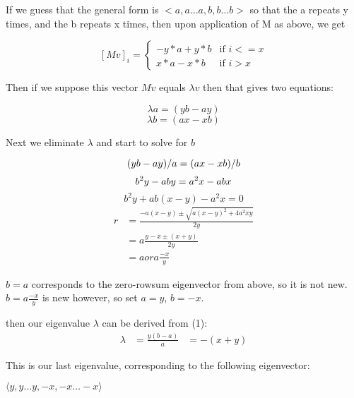 \documentclass[10pt,a4paper]{report}
\begin{document}
If we guess that the general form is $<a, a\ldots a, b, b\ldots b>$ so that the
a repeats y times, and the b repeats x times, then upon application of M as
above, we get

\[ {[Mv]}_i = \begin{cases}
	-y*a + y*b & \text{if } i <= x\\
	x*a - x*b & \text{if } i > x
\end{cases} \]

Then if we suppose this vector $Mv$ equals $\lambda v$ then that gives two
equations:

\begin{equation}
	\lambda a = (yb - ay)
\end{equation}
\begin{equation*}
	\lambda b = (ax - xb)
\end{equation*}

\pagebreak

Next we eliminate $\lambda$ and start to solve for $b$

\begin{equation*}
	(yb - ay)/a = (ax - xb)/b\\
\end{equation*}
\begin{equation*}
	b^2y - aby = a^2x - abx\\
\end{equation*}
\begin{equation*}
	b^2y + ab(x - y) - a^2x = 0
\end{equation*}
\begin{align*}
	r &= \frac{-a(x-y) \pm \sqrt{{a(x-y)}^2 + 4a^2xy}}{2y}\\
	  &= a\frac{y - x \pm (x + y)}{2y}\\
	  &= a or a\frac{-x}{y}
\end{align*}

$b = a$ corresponds to the zero-rowsum eigenvector from above, so it is not
new.
$b = a\frac{-x}{y}$ is new however, so set $a = y$, $b = -x$.

then our eigenvalue $\lambda$ can be derived from (1):
\begin{align*}
	\lambda &= \frac{y(b - a)}{a}
			&= -(x + y)
\end{align*}

This is our last eigenvalue, corresponding to the following eigenvector:

$\langle y, y\ldots y, -x, -x\ldots -x\rangle$
\end{document}
